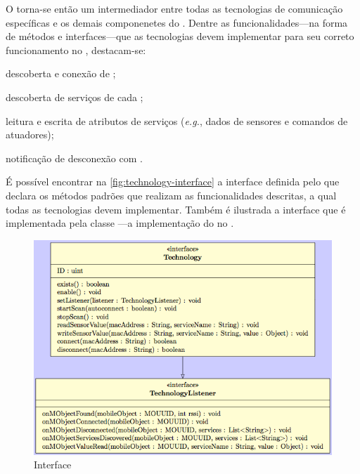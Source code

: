 O \stwopa torna-se então um intermediador entre todas as tecnologias de comunicação específicas e os demais componenetes do \middleware. Dentre as funcionalidades---na forma de métodos e interfaces---que as tecnologias devem implementar para seu correto funcionamento no \middleware, destacam-se:

\begin{alineas}
	\item descoberta e conexão de \smartobjs;
	
	\item descoberta de serviços de cada \smartobjs;

	\item leitura e escrita de atributos de serviços (\textit{e.g.}, dados de sensores e comandos de atuadores);

	\item notificação de desconexão com \smartobjs.
\end{alineas}

É possível encontrar na \autoref{fig:technology-interface} a interface \techinterface definida pelo \stwopa que declara os métodos padrões que realizam as funcionalidades descritas, a qual todas as tecnologias devem implementar. Também é ilustrada a interface \techlistener que é implementada pela classe \stwopaservice---a implementação do \stwopa no \mhub.

\begin{figure}[htb]
	\centering
	\caption{\label{fig:technology-interface}Interface \techinterface}
	\includegraphics[scale=0.6]{img/technology-interface.png}
\end{figure}

